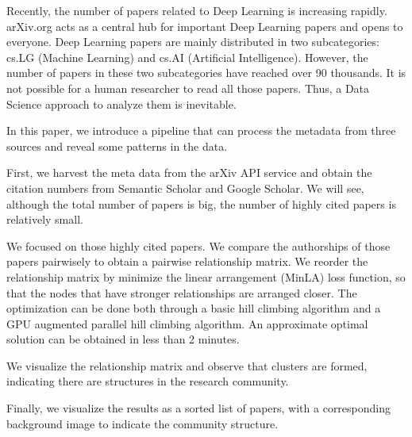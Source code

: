 
Recently, the number of papers related to Deep Learning is increasing rapidly.
arXiv.org acts as a central hub for important Deep Learning papers and opens to everyone.
Deep Learning papers are mainly distributed in two subcategories: cs.LG (Machine Learning) and cs.AI (Artificial Intelligence).
However, the number of papers in these two subcategories have reached over 90 thousands.
It is not possible for a human researcher to read all those papers.
Thus, a Data Science approach to analyze them is inevitable.

In this paper, we introduce a pipeline that can process the metadata from three sources and reveal some patterns in the data.

First, we harvest the meta data from the arXiv API service and obtain the citation numbers from Semantic Scholar and Google Scholar.
We will see, although the total number of papers is big, the number of highly cited papers is relatively small.

We focused on those highly cited papers.
We compare the authorships of those papers pairwisely to obtain a pairwise relationship matrix.
We reorder the relationship matrix by minimize the linear arrangement (MinLA) loss function, so that the nodes that have stronger relationships are arranged closer.
The optimization can be done both through a basic hill climbing algorithm and a GPU augmented parallel hill climbing algorithm.
An approximate optimal solution can be obtained in less than 2 minutes.

We visualize the relationship matrix and observe that clusters are formed, indicating there are structures in the research community.

Finally, we visualize the results as a sorted list of papers, with a corresponding background image to indicate the community structure.

